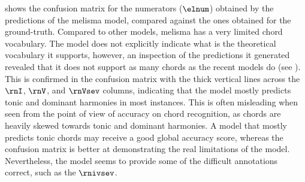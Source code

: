 

 shows the confusion matrix
for the numerators ($\elnum$) obtained by the predictions of
the \gls{melisma} model, compared against the ones obtained
for the ground-truth. Compared to other models,
\gls{melisma} has a very limited chord vocabulary. The model
does not explicitly indicate what is the theoretical
vocabulary it supports, however, an inspection of the
predictions it generated revealed that it does not support
as many chords as the recent models do (see
). This is confirmed in the
confusion matrix with the thick vertical lines across the
$\rnI$, $\rnV$, and $\rnVsev$ columns, indicating that the
model mostly predicts tonic and dominant harmonies in most
instances. This is often misleading when seen from the point
of view of accuracy on chord recognition, as chords are
heavily skewed towards tonic and dominant harmonies. A model
that mostly predicts tonic chords may receive a good global
accuracy score, whereas the confusion matrix is better at
demonstrating the real limitations of the model.
Nevertheless, the model seems to provide some of the
difficult annotations correct, such as the $\rnivsev$.



